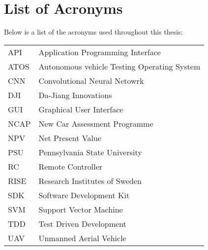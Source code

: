 \thispagestyle{plain}			%
\chapter*{List of Acronyms}
Below is a list of the acronyms used throughout this thesis:
\vspace*{1.0cm}

\begin{tabular}{p{3cm}p{12cm}}
API & Application Programming Interface \\
ATOS & Autonomous vehicle Testing Operating System\\
CNN & Convolutional Neural Netowrk\\
DJI & Da-Jiang Innovations \\
GUI & Graphical User Interface\\
NCAP & New Car Assessment Programme\\
NPV & Net Present Value \\
PSU & Pennsylvania State University\\
RC & Remote Controller\\
RISE & Research Institutes of Sweden\\
SDK & Software Development Kit \\
SVM & Support Vector Machine \\
TDD & Test Driven Development \\
UAV & Unmanned Aerial Vehicle \\





\end{tabular}



